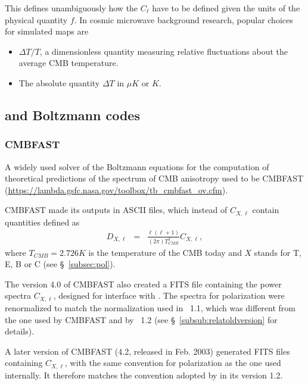\documentclass[12pt,twoside]{article}
\newcommand{\myhtmlimage}[1]{ }
\begin{document}
This defines unambiguously how the $C_\ell$ have to be defined given the
units of the physical  quantity $f$. In  cosmic
microwave background research,
popular choices for simulated maps are 
\begin{itemize}
\item $\Delta T/T $, a dimensionless quantity measuring relative
fluctuations about the average CMB temperature.
\item The absolute quantity $\Delta T$ in $\mu K$ or $K$.
\end{itemize}

\subsection{\healpix and Boltzmann codes}
\subsubsection{CMBFAST}
\label{subsec:cmbfast}
A widely used  solver of the Boltzmann equations for the computation
of theoretical predictions of the spectrum of CMB anisotropy used to be CMBFAST
(\url{https://lambda.gsfc.nasa.gov/toolbox/tb_cmbfast_ov.cfm}).

CMBFAST made its outputs in ASCII files, which instead
of $C_{X,\ell}$ contain quantities defined as
\begin{eqnarray}
  D_{X,\ell} &=& \frac{\ell(\ell+1)}{(2\pi)T_{CMB}^2}C_{X,\ell},\myhtmlimage{}
\end{eqnarray}
where $T_{CMB}=2.726K$ is the temperature of the CMB today and $X$ stands for T,
E, B or C (see \S~\ref{subsec:pol}).  

The version 4.0 of CMBFAST also created a FITS file containing the power spectra
$C_{X,\ell}$, designed for interface with \healpixns. The spectra for polarization were renormalized to match the
normalization used in \healpixns~1.1, which was different from the one used by
CMBFAST and by \healpixns~1.2 (see \S~\ref{subsub:relatoldversion} for details).


A later version of CMBFAST (4.2, released in Feb. 2003) generated FITS files containing
$C_{X,\ell}$, with the same convention for polarization as the one used
internally. It therefore matches the convention adopted by \healpix in its
version 1.2.
\end{document}
